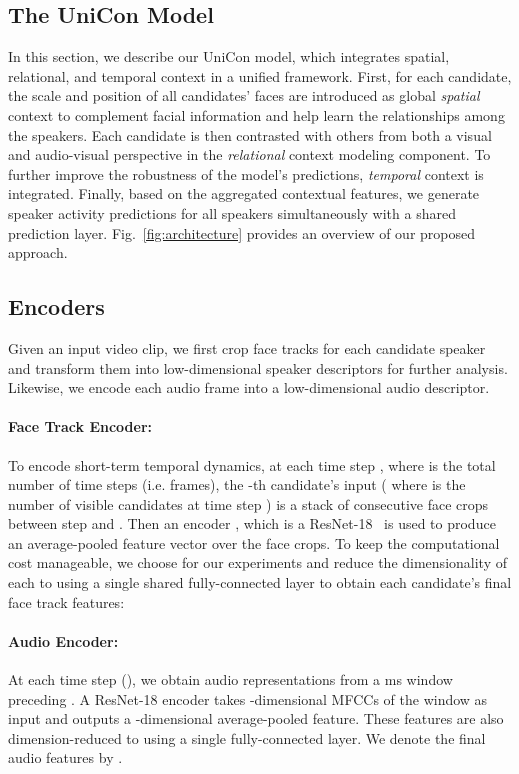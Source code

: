 \documentclass[sigconf]{acmart}
\newcommand\NetName{UniCon}
\begin{document}
\begin{CCSXML}
\section{The \NetName{} Model}
In this section, we describe our \NetName{} model, which integrates spatial, relational, and temporal context in a unified framework.
First, for each candidate, the scale and position of all candidates' faces are introduced as global \textit{spatial} context to complement facial information and help learn the relationships among the speakers. Each candidate is then contrasted with others from both a visual and audio-visual perspective in the \textit{relational} context modeling component. To further improve the robustness of the model's predictions, \textit{temporal} context is integrated. Finally, based on the aggregated contextual features, we generate speaker activity predictions for all speakers simultaneously with a shared prediction layer. Fig.~\ref{fig:architecture} provides an overview of our proposed approach.
\vspace{-2ex}
\subsection{Encoders}
Given an input video clip, we first crop face tracks for each candidate speaker and transform them into low-dimensional speaker descriptors for further analysis. Likewise, we encode each audio frame into a low-dimensional audio descriptor.
\vspace{-2ex}
\paragraph{Face Track Encoder:}
To encode short-term temporal dynamics, at each time step , where  is the total number of time steps (i.e. frames), the -th candidate's input ( where  is the number of visible candidates at time step ) is a stack of  consecutive face crops  between step  and . Then an encoder , which is a ResNet-18~\cite{DBLP:conf/cvpr/HeZRS16} is used to produce an average-pooled feature vector  over the  face crops. To keep the computational cost manageable, we choose  for our experiments and reduce the dimensionality of each  to  using a single shared fully-connected layer to obtain each candidate's final face track features:

\paragraph{Audio Encoder:}
At each time step  (), we obtain audio representations from a ms window preceding . A ResNet-18 encoder  takes -dimensional MFCCs of the window as input and outputs a -dimensional average-pooled feature. These features are also dimension-reduced to  using a single fully-connected layer. We denote the final audio features by .
\vspace{-2ex}

\end{CCSXML}
\end{document}
